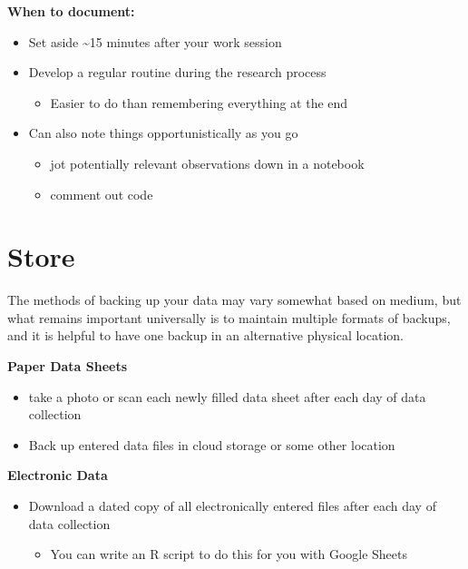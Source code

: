 \documentclass[
  letterpaper,
  DIV=11,
  numbers=noendperiod]{scrreprt}
\providecommand{\tightlist}{%
  \setlength{\itemsep}{0pt}\setlength{\parskip}{0pt}}\usepackage{longtable,booktabs,array}
\begin{document}
\textbf{When to document:}

\begin{itemize}
\item
  Set aside \textasciitilde15 minutes after your work session
\item
  Develop a regular routine during the research process

  \begin{itemize}
  \tightlist
  \item
    Easier to do than remembering everything at the end
  \end{itemize}
\item
  Can also note things opportunistically as you go

  \begin{itemize}
  \item
    jot potentially relevant observations down in a notebook
  \item
    comment out code
  \end{itemize}
\end{itemize}

\section{Store}\label{store}

The methods of backing up your data may vary somewhat based on medium,
but what remains important universally is to maintain multiple formats
of backups, and it is helpful to have one backup in an alternative
physical location.

\textbf{Paper Data Sheets}

\begin{itemize}
\item
  take a photo or scan each newly filled data sheet after each day of
  data collection
\item
  Back up entered data files in cloud storage or some other location
\end{itemize}

\textbf{Electronic Data}

\begin{itemize}
\item
  Download a dated copy of all electronically entered files after each
  day of data collection

  \begin{itemize}
  \tightlist
  \item
    You can write an R script to do this for you with Google Sheets
  \end{itemize}
\end{itemize}
\end{document}
